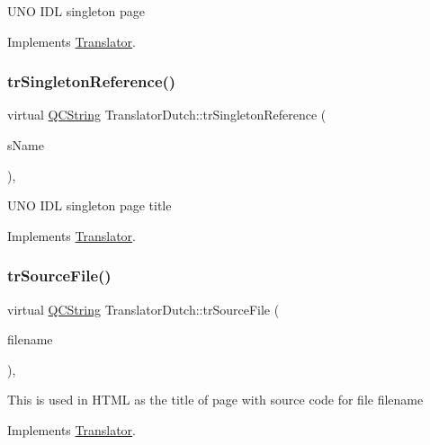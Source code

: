 U\+NO I\+DL singleton page 

Implements \mbox{\hyperlink{class_translator}{Translator}}.

\mbox{\label{class_translator_dutch_a4e17785e9fe92151a0233cc7cc893b53}} 
\subsubsection{\texorpdfstring{trSingletonReference()}{trSingletonReference()}}
{\footnotesize\ttfamily virtual \mbox{\hyperlink{class_q_c_string}{Q\+C\+String}} Translator\+Dutch\+::tr\+Singleton\+Reference (\begin{DoxyParamCaption}\item[{const char $\ast$}]{s\+Name }\end{DoxyParamCaption})\hspace{0.3cm}{\ttfamily [inline]}, {\ttfamily [virtual]}}

U\+NO I\+DL singleton page title 

Implements \mbox{\hyperlink{class_translator}{Translator}}.

\mbox{\label{class_translator_dutch_acb46528df3dbc065be0a80bd504c0648}} 
\subsubsection{\texorpdfstring{trSourceFile()}{trSourceFile()}}
{\footnotesize\ttfamily virtual \mbox{\hyperlink{class_q_c_string}{Q\+C\+String}} Translator\+Dutch\+::tr\+Source\+File (\begin{DoxyParamCaption}\item[{\mbox{\hyperlink{class_q_c_string}{Q\+C\+String}} \&}]{filename }\end{DoxyParamCaption})\hspace{0.3cm}{\ttfamily [inline]}, {\ttfamily [virtual]}}

This is used in H\+T\+ML as the title of page with source code for file filename 

Implements \mbox{\hyperlink{class_translator}{Translator}}.

